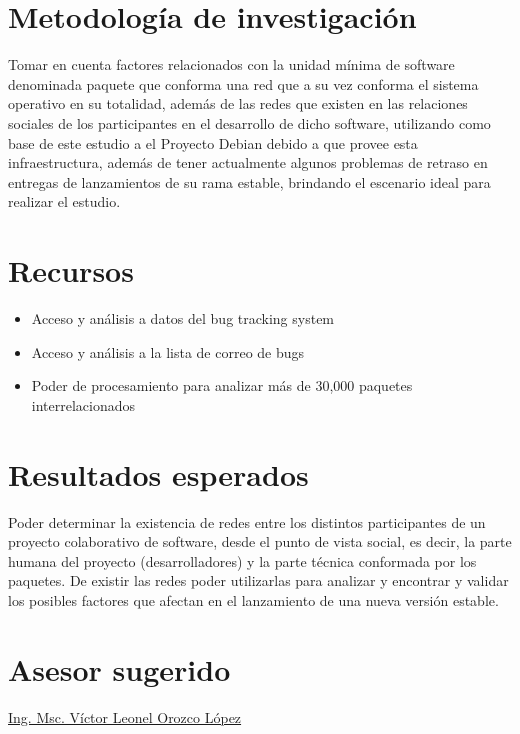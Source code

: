 \documentclass[12pt,titlepage]{report}
\begin{document}
\chapter{Metodología de investigación} %
Tomar en cuenta factores relacionados con la unidad mínima de software
denominada paquete que conforma una red que a su vez conforma el
sistema operativo en su totalidad, además de las redes que existen en
las relaciones sociales de los participantes en el desarrollo de dicho
software, utilizando como base de este estudio a el Proyecto Debian
debido a que provee esta infraestructura, además de tener actualmente
algunos problemas de retraso en entregas de lanzamientos de su rama
estable, brindando el escenario ideal para realizar el estudio.

\chapter{Recursos}
\begin{itemize}
\item Acceso y análisis a datos del bug tracking system
\item Acceso y análisis a la lista de correo de bugs
\item Poder de procesamiento para analizar más de 30,000 paquetes
  interrelacionados
\end{itemize}

\chapter{Resultados esperados}
Poder determinar la existencia de redes entre los distintos
participantes de un proyecto colaborativo de software, desde el punto
de vista social, es decir, la parte humana del proyecto
(desarrolladores) y la parte técnica conformada por los paquetes. De
existir las redes poder utilizarlas para analizar y encontrar y
validar los posibles factores que afectan en el lanzamiento de una
nueva versión estable.

\chapter{Asesor sugerido}

\href{http://vorozco.com/cv/index-es.html}{Ing.  Msc.  Víctor Leonel
  Orozco López}
\end{document}
